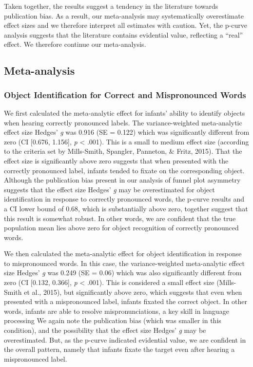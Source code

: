 \documentclass[man]{apa6}
\begin{document}
Taken together, the results suggest a tendency in the literature towards publication bias. As a result, our meta-analysis may systematically overestimate effect sizes and we therefore interpret all estimates with caution. Yet, the p-curve analysis suggests that the literature contains evidential value, reflecting a \enquote{real} effect. We therefore continue our meta-analysis.

\hypertarget{meta-analysis-1}{%
\subsection{Meta-analysis}\label{meta-analysis-1}}

\hypertarget{object-identification-for-correct-and-mispronounced-words}{%
\subsubsection{Object Identification for Correct and Mispronounced Words}\label{object-identification-for-correct-and-mispronounced-words}}

We first calculated the meta-analytic effect for infants' ability to identify objects when hearing correctly pronounced labels. The variance-weighted meta-analytic effect size Hedges' \emph{g} was 0.916 (SE = 0.122) which was significantly different from zero (CI {[}0.676, 1.156{]}, \emph{p} \textless{} .001). This is a small to medium effect size (according to the criteria set by Mills-Smith, Spangler, Panneton, \& Fritz, 2015). That the effect size is significantly above zero suggests that when presented with the correctly pronounced label, infants tended to fixate on the corresponding object. Although the publication bias present in our analysis of funnel plot asymmetry suggests that the effect size Hedges' \emph{g} may be overestimated for object identification in response to correctly pronounced words, the p-curve results and a CI lower bound of 0.68, which is substantially above zero, together suggest that this result is somewhat robust. In other words, we are confident that the true population mean lies above zero for object recognition of correctly pronounced words.

We then calculated the meta-analytic effect for object identification in response to mispronounced words. In this case, the variance-weighted meta-analytic effect size Hedges' \emph{g} was 0.249 (SE = 0.06) which was also significantly different from zero (CI {[}0.132, 0.366{]}, \emph{p} \textless{} .001). This is considered a small effect size (Mills-Smith et al., 2015), but significantly above zero, which suggests that even when presented with a mispronounced label, infants fixated the correct object. In other words, infants are able to resolve mispronunciations, a key skill in language processing We again note the publication bias (which was smaller in this condition), and the possibility that the effect size Hedges' \emph{g} may be overestimated. But, as the p-curve indicated evidential value, we are confident in the overall pattern, namely that infants fixate the target even after hearing a mispronounced label.
\end{document}
